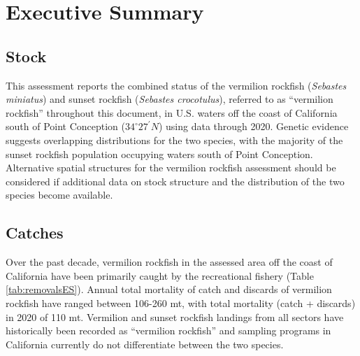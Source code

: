 \documentclass[11pt,
  english,
]{article}
\begin{document}

\hypertarget{executive-summary}{%
\section*{Executive Summary}\label{executive-summary}}

\leavevmode\tagmcend\tagstructend


\hypertarget{stock}{%
\subsection*{Stock}\label{stock}}

\leavevmode\tagmcend\tagstructend

This assessment reports the combined status of the vermilion rockfish (\emph{Sebastes miniatus}) and sunset rockfish (\emph{Sebastes crocotulus}), referred to as ``vermilion rockfish'' throughout this document, in U.S. waters off the coast of California south of Point Conception ($34^\circ 27^\prime N$) using data through 2020. Genetic evidence suggests overlapping distributions for the two species, with the majority of the sunset rockfish population occupying waters south of Point Conception. Alternative spatial structures for the vermilion rockfish assessment should be considered if additional data on stock structure and the distribution of the two species become available.


\hypertarget{catches}{%
\subsection*{Catches}\label{catches}}

\leavevmode\tagmcend\tagstructend

Over the past decade, vermilion rockfish in the assessed area off the coast of California have been primarily caught by the recreational fishery (Table \ref{tab:removalsES}). Annual total mortality of catch and discards of vermilion rockfish have ranged between 106-260 mt, with total mortality (catch + discards) in 2020 of 110 mt. Vermilion and sunset rockfish landings from all sectors have historically been recorded as ``vermilion rockfish'' and sampling programs in California currently do not differentiate between the two species.
\end{document}
